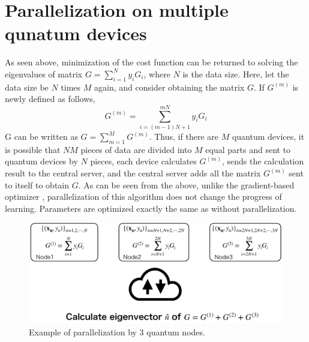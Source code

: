 \section{Parallelization on multiple qunatum devices}
As seen above, minimization of the cost function can be returned to solving the eigenvalues of matrix $G=\sum_{i=1}^Ny_iG_i$, where $N$ is the data size. 
Here, let the data size be $N$ times $M$ again, and consider obtaining the matrix $G$. If $G^{(m)}$ is newly defined as follows, 
$$G^{(m)}=\sum_{i=(m-1)N+1}^{mN}y_iG_i$$
G can be written as $G=\sum_{m=1}^MG^{(m)}$. Thus, if there are $M$ quantum devices, it is possible that $NM$ pieces of data are divided into $M$ equal parts and sent to quantum devices by $N$ pieces, each device calculates $G^{(m)}$, sends the calculation result to the central server, and the central server adds all the matrix $G^{(m)}$ sent to itself to obtain $G$. As can be seen from the above, unlike the gradient-based optimizer \cite{9775600, Qi_2022}, parallelization of this algorithm does not change the progress of learning. Parameters are optimized exactly the same as without parallelization.

\begin{figure}[htb]
    \centering
    \includegraphics[keepaspectratio, scale=0.5]{method/example.png}
    \caption{Example of parallelization by 3 quantum nodes.}
    \label{fig:example}
\end{figure}
